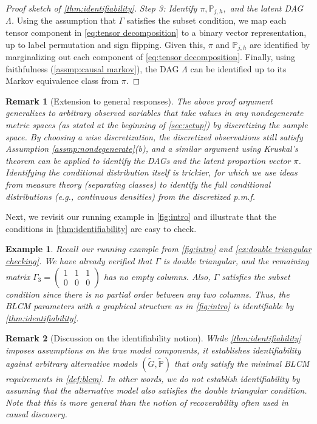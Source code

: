 \documentclass[10pt]{article} %
\newtheorem{example}{Example}
\newtheorem{remark}{Remark}
\newcommand{\PP}{\mathbb P}
\def\tilde{\widetilde}
\begin{document}
\begin{proof}[Proof sketch of \cref{thm:identifiability}]
\textit{Step 3: Identify $\pi, \PP_{j,h},$ and the latent DAG $\Lambda$.}
Using the assumption that $\Gamma$ satisfies the subset condition, we map each tensor component in \eqref{eq:tensor decomposition} to a binary vector representation, up to label permutation and sign flipping. Given this, $\pi$ and $\PP_{j,h}$ are identified by marginalizing out each component of \eqref{eq:tensor decomposition}. Finally, using faithfulness (\cref{assmp:causal markov}), the DAG $\Lambda$ can be identified up to its Markov equivalence class from $\pi$.
\end{proof}


\begin{remark}[Extension to general responses]
    {The above proof argument generalizes to arbitrary observed variables that take values in any nondegenerate metric spaces (as stated at the beginning of \cref{sec:setup}) by discretizing the sample space. By choosing a wise discretization, the discretized observations still satisfy Assumption \ref{assmp:nondegenerate}(b), and a similar argument using Kruskal's theorem can be applied to identify the DAGs and the latent proportion vector $\pi$. Identifying the conditional distribution itself is trickier, for which we use ideas from measure theory (separating classes) to identify the full conditional distributions (e.g., continuous densities) from the discretized p.m.f.}
\end{remark}
%
%
%

Next, we revisit our running example in \cref{fig:intro} and illustrate that the conditions in \cref{thm:identifiability} are easy to check.
\begin{example}
    Recall our running example from \cref{fig:intro} and \cref{ex:double triangular checking}. We have already verified that $\Gamma$ is double triangular, and the remaining matrix $\Gamma_3 = \begin{pmatrix}
        1 & 1 & 1 \\ 0 & 0 & 0
    \end{pmatrix}$ has no empty columns. Also, $\Gamma$ satisfies the subset condition since there is no partial order between any two columns. 
    Thus, the BLCM parameters with a graphical structure as in \cref{fig:intro} is identifiable by \cref{thm:identifiability}.
\end{example}

\begin{remark}[Discussion on the identifiability notion]\label{rmk:identifiability}
    While \cref{thm:identifiability} imposes assumptions on the true model components, it establishes identifiability against \emph{arbitrary alternative models} $(\tilde{G}, \tilde{\PP})$ that only satisfy the minimal BLCM requirements in \cref{def:blcm}. In other words, we do not establish identifiability by assuming that the alternative model also satisfies the double triangular condition. 
    {Note that this is more general than the notion of \emph{recoverability} often used in causal discovery.}
\end{remark}
\end{document}
